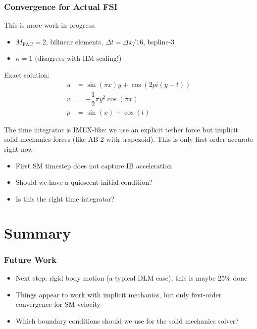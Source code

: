 \documentclass[8pt]{beamer}
\newcommand{\mfac}{M_\text{FAC}}
\begin{document}
\begin{frame}
    \frametitle{Convergence for Actual FSI}
    This is more work-in-progress.
    \begin{itemize}
      \item $\mfac = 2$, bilinear elements, $\Delta t = \Delta x / 16$,
        bspline-3
      \item $\kappa = 1$ (disagrees with IIM scaling!)
    \end{itemize}
    Exact solution:
    \begin{align}
      u &= \sin(\pi x) y + \cos(2 pi (y - t)) \\
      v &= -\dfrac{1}{2} \pi y^2 \cos(\pi x) \\
      p &= \sin(x) + \cos(t)
    \end{align}

    The time integrator is IMEX-like: we use an explicit tether force but
    implicit solid mechanics forces (like AB-2 with trapezoid). This is only
    first-order accurate right now.
    \begin{itemize}
      \item First SM timestep does not capture IB acceleration
      \item Should we have a quiescent initial condition?
      \item Is this the right time integrator?
    \end{itemize}
\end{frame}

\section{Summary}
\begin{frame}
    \frametitle{Future Work}
    \begin{itemize}
      \item Next step: rigid body motion (a typical DLM case), this is maybe 25\% done
      \item Things appear to work with implicit mechanics, but only first-order convergence for SM velocity
      \item Which boundary conditions should we use for the solid mechanics solver?
    \end{itemize}
\end{frame}
\end{document}
